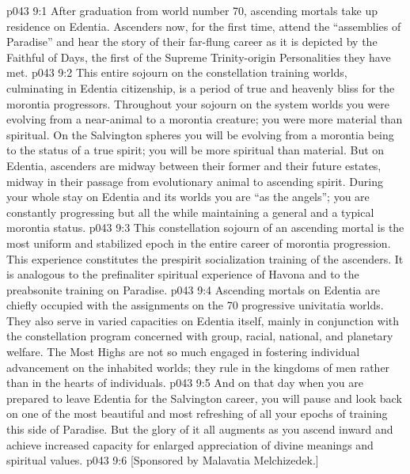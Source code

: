 \vs p043 9:1 After graduation from world number 70, ascending mortals take up residence on Edentia. Ascenders now, for the first time, attend the “assemblies of Paradise” and hear the story of their far\hyp{}flung career as it is depicted by the Faithful of Days, the first of the Supreme Trinity\hyp{}origin Personalities they have met.
\vs p043 9:2 \pc This entire sojourn on the constellation training worlds, culminating in Edentia citizenship, is a period of true and heavenly bliss for the morontia progressors. Throughout your sojourn on the system worlds you were evolving from a near\hyp{}animal to a morontia creature; you were more material than spiritual. On the Salvington spheres you will be evolving from a morontia being to the status of a true spirit; you will be more spiritual than material. But on Edentia, ascenders are midway between their former and their future estates, midway in their passage from evolutionary animal to ascending spirit. During your whole stay on Edentia and its worlds you are “as the angels”; you are constantly progressing but all the while maintaining a general and a typical morontia status.
\vs p043 9:3 This constellation sojourn of an ascending mortal is the most uniform and stabilized epoch in the entire career of morontia progression. This experience constitutes the prespirit socialization training of the ascenders. It is analogous to the prefinaliter spiritual experience of Havona and to the preabsonite training on Paradise.
\vs p043 9:4 \pc Ascending mortals on Edentia are chiefly occupied with the assignments on the 70 progressive univitatia worlds. They also serve in varied capacities on Edentia itself, mainly in conjunction with the constellation program concerned with group, racial, national, and planetary welfare. The Most Highs are not so much engaged in fostering individual advancement on the inhabited worlds; they rule in the kingdoms of men rather than in the hearts of individuals.
\vs p043 9:5 And on that day when you are prepared to leave Edentia for the Salvington career, you will pause and look back on one of the most beautiful and most refreshing of all your epochs of training this side of Paradise. But the glory of it all augments as you ascend inward and achieve increased capacity for enlarged appreciation of divine meanings and spiritual values.
\vsetoff
\vs p043 9:6 [Sponsored by Malavatia Melchizedek.]
\quizlink
